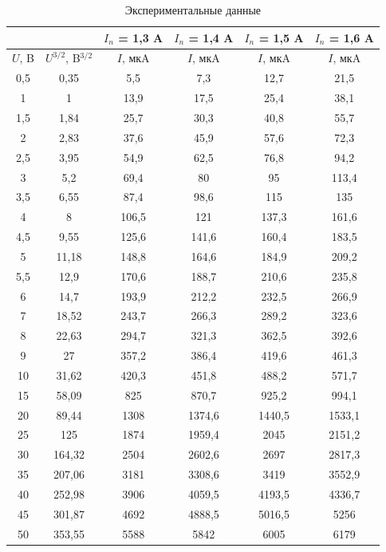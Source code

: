 \documentclass[a4paper,12pt]{article}
\begin{document}
\begin{table}[h!]
	\centering
	\caption{ Экспериментальные данные }

\begin{tabular}{|c|c|c|c|c|c|}
	\hline 
	& & $I_n$ = 1,3 A & $I_n$ = 1,4 A & $I_n$ = 1,5 A & $I_n$ = 1,6 A \\ 
	\hline 
	$U$, B & $U^{3/2}$, B$^{3/2}$ & $I$, мкA & $I$, мкA & $I$, мкA & $I$, мкA \\ 
	\hline 
	0,5 & 0,35 & 5,5 & 7,3 & 12,7 & 21,5 \\ 
	\hline 
	1 & 1 & 13,9 & 17,5 & 25,4 & 38,1 \\ 
	\hline 
	1,5 & 1,84 & 25,7 & 30,3 & 40,8 & 55,7 \\ 
	\hline 
	2 & 2,83 & 37,6 & 45,9 & 57,6 & 72,3 \\ 
	\hline 
	2,5 & 3,95 & 54,9 & 62,5 & 76,8 & 94,2 \\ 
	\hline 
	3 & 5,2 & 69,4 & 80 & 95 & 113,4 \\ 
	\hline 
	3,5 & 6,55 & 87,4 & 98,6 & 115 & 135 \\ 
	\hline 
	4 & 8 & 106,5 & 121 & 137,3 & 161,6 \\ 
	\hline 
	4,5 & 9,55 & 125,6 & 141,6 & 160,4 & 183,5 \\ 
	\hline 
	5 & 11,18 & 148,8 & 164,6 & 184,9 & 209,2 \\ 
	\hline 
	5,5 & 12,9 & 170,6 & 188,7 & 210,6 & 235,8 \\ 
	\hline 
	6 & 14,7 & 193,9 & 212,2 & 232,5 & 266,9 \\ 
	\hline 
	7 & 18,52 & 243,7 & 266,3 & 289,2 & 323,6 \\ 
	\hline 
	8 & 22,63 & 294,7 & 321,3 & 362,5 & 392,6 \\ 
	\hline 
	9 & 27 & 357,2 & 386,4 & 419,6 & 461,3 \\ 
	\hline 
	10 & 31,62 & 420,3 & 451,8 & 488,2 & 571,7 \\ 
	\hline 
	15 & 58,09 & 825 & 870,7 & 925,2 & 994,1 \\ 
	\hline 
	20 & 89,44 & 1308 & 1374,6 & 1440,5 & 1533,1 \\ 
	\hline 
	25 & 125 & 1874 & 1959,4 & 2045 & 2151,2 \\ 
	\hline 
	30 & 164,32 & 2504 & 2602,6 & 2697 & 2817,3 \\ 
	\hline 
	35 & 207,06 & 3181 & 3308,6 & 3419 & 3552,9 \\ 
	\hline 
	40 & 252,98 & 3906 & 4059,5 & 4193,5 & 4336,7 \\ 
	\hline 
	45 & 301,87 & 4692 & 4888,5 & 5016,5 & 5256 \\ 
	\hline 
	50 & 353,55 & 5588 & 5842 & 6005 & 6179 \\ 
	\hline 
\end{tabular} 
\end{table}
\end{document}
